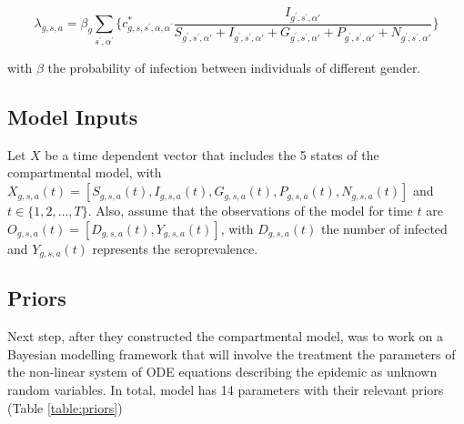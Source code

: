 \documentclass[12pt]{article}
\begin{document}
\begin{equation}
\lambda_{g,s,a}=\beta_{g}\sum_{s^{'}, \alpha^{'}} \bigg\{ c^{*}_{g,s,s^{'},\alpha,\alpha^{'}} \frac{I_{g^{'}, s^{'}, \alpha{'}}}{S_{g^{'}, s^{'}, \alpha{'}} + I_{g^{'}, s^{'}, \alpha{'}} + G_{g^{'}, s^{'}, \alpha{'}} + P_{g^{'}, s^{'}, \alpha{'}} + N_{g^{'}, s^{'}, \alpha{'}} } \bigg\}
\end{equation}

with $\beta$ the probability of infection between individuals of different gender. 

\subsection{Model Inputs}

Let $X$ be a time dependent vector that includes the 5 states of the compartmental model, with $X_{g,s,a}(t)=[S_{g,s,a}(t), I_{g,s,a}(t), G_{g,s,a}(t), P_{g,s,a}(t), N_{g,s,a}(t)]$ and $t \in \{1,2,\dots,T \}$. Also, assume that the observations of the model for time $t$ are $O_{g,s,a}(t)=[D_{g,s,a}(t), Y_{g,s,a}(t)]$, with $D_{g,s,a}(t)$ the number of infected and $Y_{g,s,a}(t)$ represents the seroprevalence.

\subsection{Priors}

Next step, after they constructed the compartmental model, was to work on a Bayesian modelling framework that will involve the treatment the parameters of the non-linear system of ODE equations describing the epidemic as unknown random variables. In total, \cite{Gareth:2013} model has 14 parameters with their relevant priors (Table \ref{table:priors})
\end{document}
